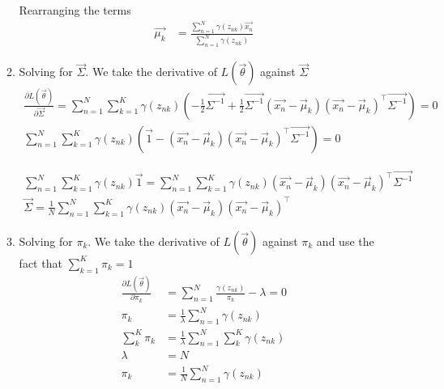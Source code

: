 \documentclass[12pt,twoside]{article}
\begin{document}
\begin{enumerate}
\begin{enumerate}
Rearranging the terms
\begin{align*}
\vec{\mu_k} &= \frac{\sum_{n=1}^N \gamma(z_{nk})\vec{x_n}}{\sum_{n=1}^N \gamma(z_{nk})}
\end{align*}

\item Solving for $\vec{\Sigma}$. We take the derivative of $L(\vec{\theta})$ against $\vec{\Sigma}$
\begin{align*}
\frac{\partial L(\vec{\theta})}{\partial \vec{\Sigma}}
=\sum_{n=1}^N\sum_{k=1}^K \gamma(z_{nk})\left(-\frac{1}{2}\vec{\Sigma^{-1}}+\frac{1}{2}\vec{\Sigma^{-1}}(\vec{x_n}-\vec{\mu}_k)(\vec{x_n}-\vec{\mu}_k)^\top\vec{\Sigma^{-1}}\right)=0\\
\sum_{n=1}^N\sum_{k=1}^K \gamma(z_{nk})\left(\vec{1}-(\vec{x_n}-\vec{\mu}_k)(\vec{x_n}-\vec{\mu}_k)^\top\vec{\Sigma^{-1}}\right)=0
\end{align*}

\begin{align*}
\sum_{n=1}^N\sum_{k=1}^K \gamma(z_{nk})\vec{1}=\sum_{n=1}^N\sum_{k=1}^K \gamma(z_{nk})(\vec{x_n}-\vec{\mu}_k)(\vec{x_n}-\vec{\mu}_k)^\top\vec{\Sigma^{-1}}\\
\vec{\Sigma}=\frac{1}{N}\sum_{n=1}^N\sum_{k=1}^K \gamma(z_{nk})(\vec{x_n}-\vec{\mu}_k)(\vec{x_n}-\vec{\mu}_k)^\top
\end{align*}

\item Solving for $\pi_k$. We take the derivative  of $L(\vec{\theta})$ against $\pi_k$ and use the fact that $\sum_{k=1}^K\pi_k=1$
\begin{align*}
\frac{\partial L(\vec{\theta})}{\partial \pi_k}
&= \sum_{n=1}^N\frac{\gamma(z_{nk})}{\pi_k}-\lambda =0\\
\pi_k &=\frac{1}{\lambda}\sum_{n=1}^N\gamma(z_{nk})\\
\sum_{k}^K \pi_k &=\frac{1}{\lambda}\sum_{n=1}^N\sum_{k}^K\gamma(z_{nk})\\
\lambda & = N\\
\pi_k &=\frac{1}{N}\sum_{n=1}^N\gamma(z_{nk})
\end{align*}


\end{enumerate}

\end{enumerate}
\end{document}

